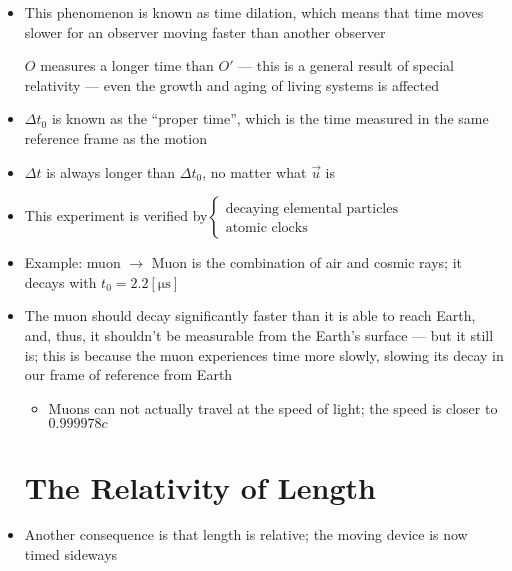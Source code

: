 \begin{itemize}
\begin{itemize}
      \item This phenomenon is known as time dilation, which means that time moves slower for an observer moving faster than another observer

        \uten $O$ measures a longer time than $O'$ — this is a general result of special relativity — even the growth and aging of living systems is affected

      \item $\Delta t_0$ is known as the ``proper time'', which is the time measured in the same reference frame as the motion

      \item $\Delta t$ is always longer than $\Delta t_0$, no matter what $\overrightarrow{u}$ is

      \item This experiment is verified by$\left\{\begin{array}{c} \text{decaying elemental particles}\\ \text{atomic clocks}\end{array}$

        \item Example: muon $\rightarrow$ Muon is the combination of air and cosmic rays; it decays with $t_0=2.2[\si{\micro\second}]$

        \item The muon should decay significantly faster than it is able to reach Earth, and, thus, it shouldn't be measurable from the Earth's surface — but it still is; this is because the muon experiences time more slowly, slowing its decay in our frame of reference from Earth

          \begin{itemize}

            \item Muons can not actually travel at the speed of light; the speed is closer to $0.999978c$

          \end{itemize}

          \newpage

          \section{The Relativity of Length}

        \item Another consequence is that length is relative; the moving device is now timed sideways


\end{itemize}
\end{itemize}
